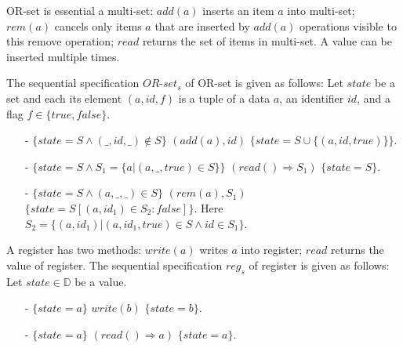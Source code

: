 {%

\begin{example}
\label{def:specification-ORS}
OR-set is essential a multi-set: $\mathit{add}(a)$ inserts an item $a$
into multi-set; $\mathit{rem}(a)$ cancels only items $a$ that are
inserted by $\mathit{add}(a)$ operations visible to this remove
operation; $\mathit{read}$ returns the set of items in multi-set. A
value can be inserted multiple times.

The sequential specification $\mathit{OR}$-$\mathit{set}_s$ of OR-set
is given as follows: Let $\mathit{state}$ be a set and each its
element $(a,\mathit{id},f)$ is a tuple of a data $a$, an identifier
$\mathit{id}$, and a flag $f \in \{ \mathit{true},\mathit{false} \}$.
\begin{itemize}
\setlength{\itemsep}{0.5pt}
\item[-] $\{ \mathit{state} = S  \wedge (\_,\mathit{id},\_) \notin S
  \}$ $(\mathit{add}(a),\mathit{id})$ $\{ \mathit{state} = S \cup \{
  (a,\mathit{id},\mathit{true}) \} \}$.
\item[-] $\{ \mathit{state} = S \wedge S_1 = \{ a \vert
  (a,\_,\mathit{true}) \in S \} \}$ $(\mathit{read}() \Rightarrow
  S_1)$ $\{ \mathit{state} = S \}$.
\item[-] $\{ \mathit{state} = S \wedge (a,\_,\_) \in S\}$
  $(rem(a),S_1)$ $\{ \mathit{state} = S[(a,\mathit{id}_1) \in S_2 :
  \mathit{false}] \}$. Here $S_2 = \{ (a,\mathit{id}_1) \vert
  (a,\mathit{id}_1,\mathit{true}) \in S \wedge id \in S_1 \}$.
\end{itemize}
\end{example}


\begin{example}
\label{def:spec-register}
A register has two methods: $\mathit{write}(a)$ writes $a$ into
register; $\mathit{read}$ returns the value of register. The
sequential specification $\mathit{reg}_s$ of register is given as
follows: Let $\mathit{state} \in \mathbb{D}$ be a value.
\begin{itemize}
\setlength{\itemsep}{0.5pt}
\item[-] $\{ \mathit{state} = a  \}$ $\mathit{write}(b)$ $\{
  \mathit{state} = b \}$.
\item[-] $\{ \mathit{state} = a \}$ $(\mathit{read}() \Rightarrow a)$
  $\{ \mathit{state} = a \}$.
\end{itemize}
\end{example}


}
